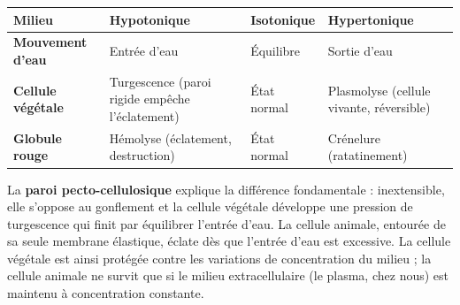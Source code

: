 \documentclass[11pt]{article}
\begin{document}
\begin{center}
\begin{tabularx}{\linewidth}{|l|X|X|X|}
\hline
\rowcolor{popblueL} \textbf{Milieu} & \textbf{Hypotonique} & \textbf{Isotonique} & \textbf{Hypertonique} \\
\hline
\textbf{Mouvement d'eau} & Entrée d'eau & Équilibre & Sortie d'eau \\
\hline
\textbf{Cellule végétale} & Turgescence (paroi rigide empêche l'éclatement) & État normal & Plasmolyse (cellule vivante, réversible) \\
\hline
\textbf{Globule rouge} & Hémolyse (éclatement, destruction) & État normal & Crénelure (ratatinement) \\
\hline
\end{tabularx}
\end{center}

La \textbf{paroi pecto-cellulosique} explique la différence fondamentale : inextensible, elle s'oppose au gonflement et la cellule végétale développe une pression de turgescence qui finit par équilibrer l'entrée d'eau. La cellule animale, entourée de sa seule membrane élastique, éclate dès que l'entrée d'eau est excessive. La cellule végétale est ainsi protégée contre les variations de concentration du milieu ; la cellule animale ne survit que si le milieu extracellulaire (le plasma, chez nous) est maintenu à concentration constante.
\end{document}
